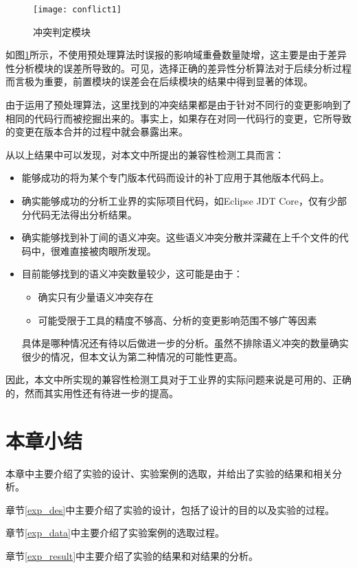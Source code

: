 \begin{figure}[H]
	\centering
	\texttt{[image: conflict1]}
	\caption {冲突判定模块}
	\label {conflict_data}	
\end{figure}

如图\ref {conflict_data}所示，不使用预处理算法时误报的影响域重叠数量陡增，这主要是由于差异性分析模块的误差所导致的。可见，选择正确的差异性分析算法对于后续分析过程而言极为重要，前置模块的误差会在后续模块的结果中得到显著的体现。

由于运用了预处理算法，这里找到的冲突结果都是由于针对不同行的变更影响到了相同的代码行而被挖掘出来的。事实上，如果存在对同一代码行的变更，它所导致的变更在版本合并的过程中就会暴露出来。

从以上结果中可以发现，对本文中所提出的兼容性检测工具而言：
\begin{itemize}
	\item 能够成功的将为某个专门版本代码而设计的补丁应用于其他版本代码上。
	\item 确实能够成功的分析工业界的实际项目代码，如Eclipse JDT Core，仅有少部分代码无法得出分析结果。
	\item 确实能够找到补丁间的语义冲突。这些语义冲突分散并深藏在上千个文件的代码中，很难直接被肉眼所发现。
	\item 目前能够找到的语义冲突数量较少，这可能是由于：
		\begin{itemize}
			\item 确实只有少量语义冲突存在
			\item 可能受限于工具的精度不够高、分析的变更影响范围不够广等因素
		\end{itemize}
		具体是哪种情况还有待以后做进一步的分析。虽然不排除语义冲突的数量确实很少的情况，但本文认为第二种情况的可能性更高。
\end{itemize}

因此，本文中所实现的兼容性检测工具对于工业界的实际问题来说是可用的、正确的，然而其实用性还有待进一步的提高。

\section{本章小结}
本章中主要介绍了实验的设计、实验案例的选取，并给出了实验的结果和相关分析。

章节\ref {exp_des}中主要介绍了实验的设计，包括了设计的目的以及实验的过程。

章节\ref {exp_data}中主要介绍了实验案例的选取过程。

章节\ref {exp_result}中主要介绍了实验的结果和对结果的分析。